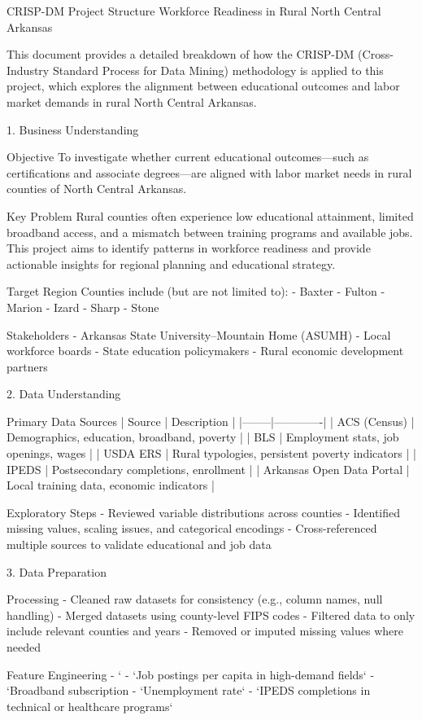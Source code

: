 CRISP-DM Project Structure  
Workforce Readiness in Rural North Central Arkansas

This document provides a detailed breakdown of how the CRISP-DM (Cross-Industry Standard Process for Data Mining) methodology is applied to this project, which explores the alignment between educational outcomes and labor market demands in rural North Central Arkansas.

1. Business Understanding

Objective
To investigate whether current educational outcomes—such as certifications and associate degrees—are aligned with labor market needs in rural counties of North Central Arkansas.

Key Problem
Rural counties often experience low educational attainment, limited broadband access, and a mismatch between training programs and available jobs. This project aims to identify patterns in workforce readiness and provide actionable insights for regional planning and educational strategy.

Target Region
Counties include (but are not limited to):
- Baxter  
- Fulton  
- Marion  
- Izard  
- Sharp  
- Stone  

Stakeholders
- Arkansas State University–Mountain Home (ASUMH)
- Local workforce boards
- State education policymakers
- Rural economic development partners

2. Data Understanding

Primary Data Sources
| Source | Description |
|--------|-------------|
| ACS (Census) | Demographics, education, broadband, poverty |
| BLS | Employment stats, job openings, wages |
| USDA ERS | Rural typologies, persistent poverty indicators |
| IPEDS | Postsecondary completions, enrollment |
| Arkansas Open Data Portal | Local training data, economic indicators |

Exploratory Steps
- Reviewed variable distributions across counties
- Identified missing values, scaling issues, and categorical encodings
- Cross-referenced multiple sources to validate educational and job data

3. Data Preparation

Processing
- Cleaned raw datasets for consistency (e.g., column names, null handling)
- Merged datasets using county-level FIPS codes
- Filtered data to only include relevant counties and years
- Removed or imputed missing values where needed

Feature Engineering
- `%
- `Job postings per capita in high-demand fields`
- `Broadband subscription %
- `Unemployment rate`
- `IPEDS completions in technical or healthcare programs`


